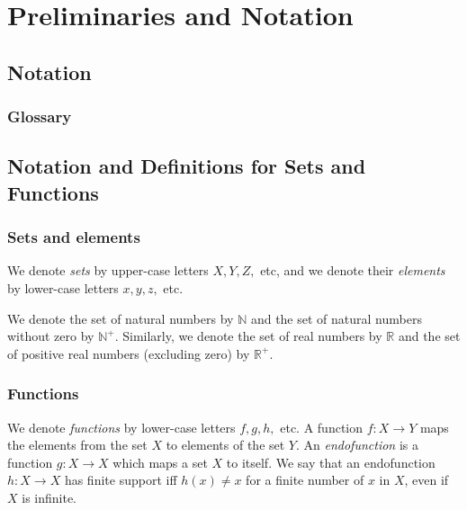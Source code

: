 

\chapter{Preliminaries and Notation} %
\label{ch:Preliminaries} %

\section{Notation}
\subsection{Glossary}
\todo[inline]{}
\section{Notation and Definitions for Sets and Functions}
\subsection{Sets and elements}
We denote \emph{sets} by upper-case letters $X,Y,Z,$ etc, and we denote their \emph{elements} by lower-case letters $x, y, z, $ etc. 

We denote the set of natural numbers by $\mathbb{N}$ and the set of natural numbers without zero by $\mathbb{N}^+$. Similarly, we denote the set of real numbers by $\mathbb{R}$ and the set of positive real numbers (excluding zero) by $\mathbb{R}^+$.

\subsection{Functions}
We denote \emph{functions} by lower-case letters $f,g,h,$ etc. A function $f\colon X\rightarrow Y$ maps the elements from the set $X$ to elements of the set $Y$. An \emph{endofunction} is a function $g\colon X\rightarrow X$ which maps a set $X$ to itself. We say that an endofunction $h\colon X \rightarrow X$ has finite support iff $h(x)\neq x$ for a finite number of $x$ in $X$, even if $X$ is infinite.


